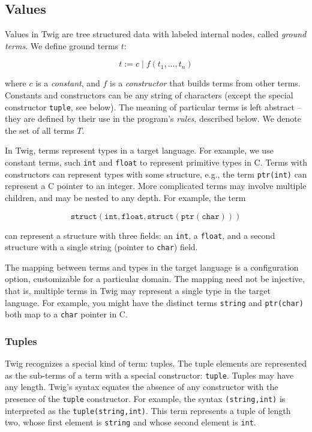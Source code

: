 
\subsection{Values}

Values in Twig are tree structured data with labeled internal
nodes, called \emph{ground terms}. We define ground terms $t$:

\[
t \;\mbox{:=}\; c \;|\; f(t_1,\ldots,t_n)
\]

where $c$ is a \emph{constant}, and $f$ is a \emph{constructor}
that builds terms from other terms. Constants and constructors can
be any string of characters (except the special constructor
\texttt{tuple}, see below). The meaning of particular terms is
left abstract -- they are defined by their use in the program's
\emph{rules}, described below. We denote the set of all terms $T$.

In Twig, terms represent types in a target language. For example,
we use constant terms, such \texttt{int} and \texttt{float} to
represent primitive types in C. Terms with constructors can
represent types with some structure, e.g., the term
\texttt{ptr(int)} can represent a C pointer to an integer. More
complicated terms may involve multiple children, and may be nested
to any depth. For example, the term

\[
\mathtt{struct(int,float,struct(ptr(char)))}
\]

can represent a structure with three fields: an \texttt{int}, a
\texttt{float}, and a second structure with a single string
(pointer to \texttt{char}) field.

The mapping between terms and types in the target language is a
configuration option, customizable for a particular domain. The
mapping need not be injective, that is, multiple terms in Twig may
represent a single type in the target language. For example, you
might have the distinct terms \texttt{string} and
\texttt{ptr(char)} both map to a \texttt{char} pointer in C.


\subsubsection{Tuples}

Twig recognizes a special kind of term: tuples. The tuple elements
are represented as the sub-terms of a term with a special
constructor: \texttt{tuple}. Tuples may have any length. Twig's
syntax equates the absence of any constructor with the presence of
the \texttt{tuple} constructor. For example, the syntax
\texttt{(string,int)} is interpreted as the
\texttt{tuple(string,int)}. This term represents a tuple of length
two, whose first element is \texttt{string} and whose second
element is \texttt{int}.

